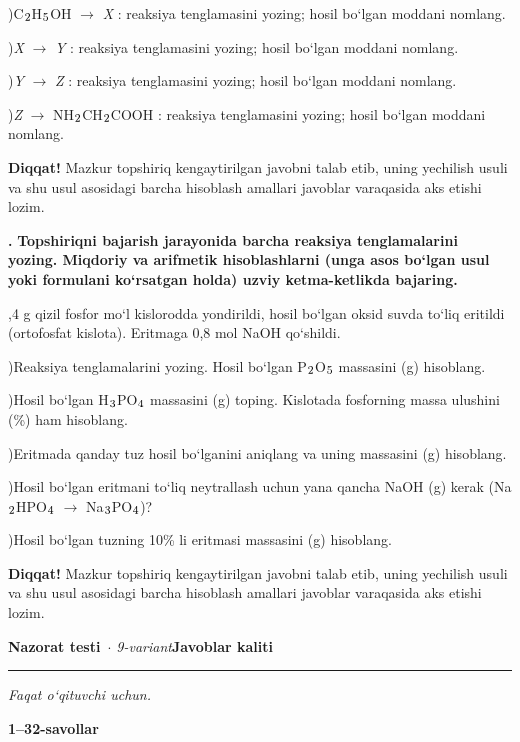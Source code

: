 \documentclass[11pt,a4paper]{article}
\renewcommand{\textsubscript}[1]{\ensuremath{_{\text{\fontsize{8}{8}\selectfont #1}}}}
\newcommand{\qn}[1]{\textbf{\fontsize{11.5}{13}\selectfont #1}}
\newcommand{\qsep}{\par\vspace{1pt}\noindent\rule{0pt}{0.4pt}\par\vspace{5pt}}
\newcommand{\diqqat}[1]{\par\smallskip\noindent\textbf{Diqqat!} #1\par\medskip}
\begin{document}
)C\textsubscript{2}H\textsubscript{5}OH $\to$ \textit{X} : reaksiya tenglamasini yozing; hosil bo`lgan moddani nomlang.\par
{})\textit{X} $\to$ \textit{Y} : reaksiya tenglamasini yozing; hosil bo`lgan moddani nomlang.\par
{})\textit{Y} $\to$ \textit{Z} : reaksiya tenglamasini yozing; hosil bo`lgan moddani nomlang.\par
{})\textit{Z} $\to$ NH\textsubscript{2}CH\textsubscript{2}COOH : reaksiya tenglamasini yozing; hosil bo`lgan moddani nomlang.\par
\diqqat{Mazkur topshiriq kengaytirilgan javobni talab etib, uning yechilish usuli va shu usul asosidagi barcha hisoblash amallari javoblar varaqasida aks etishi lozim.}\qsep
\noindent\qn{43.} \textbf{Topshiriqni bajarish jarayonida barcha reaksiya tenglamalarini yozing. Miqdoriy va arifmetik hisoblashlarni (unga asos bo`lgan usul yoki formulani ko`rsatgan holda) uzviy ketma-ketlikda bajaring.}\par{},4 g qizil fosfor mo`l kislorodda yondirildi, hosil bo`lgan oksid suvda to`liq eritildi (ortofosfat kislota). Eritmaga 0,8 mol NaOH qo`shildi.\par
{})Reaksiya tenglamalarini yozing. Hosil bo`lgan P\textsubscript{2}O\textsubscript{5} massasini (g) hisoblang.\par
{})Hosil bo`lgan H\textsubscript{3}PO\textsubscript{4} massasini (g) toping. Kislotada fosforning massa ulushini (\%) ham hisoblang.\par
{})Eritmada qanday tuz hosil bo`lganini aniqlang va uning massasini (g) hisoblang.\par
{})Hosil bo`lgan eritmani to`liq neytrallash uchun yana qancha NaOH (g) kerak (Na\textsubscript{2}HPO\textsubscript{4} $\to$ Na\textsubscript{3}PO\textsubscript{4})?\par
{})Hosil bo`lgan tuzning 10\% li eritmasi massasini (g) hisoblang.\par
\diqqat{Mazkur topshiriq kengaytirilgan javobni talab etib, uning yechilish usuli va shu usul asosidagi barcha hisoblash amallari javoblar varaqasida aks etishi lozim.}\qsep
\newpage
\noindent\textbf{\fontsize{13}{15}\selectfont Nazorat testi}\ \textit{$\cdot$ 9-variant}\hfill \textbf{Javoblar kaliti}\par\smallskip\hrule\smallskip
\textit{Faqat o`qituvchi uchun.}\par\medskip
\noindent\textbf{1--32-savollar}\par\smallskip
\end{document}

